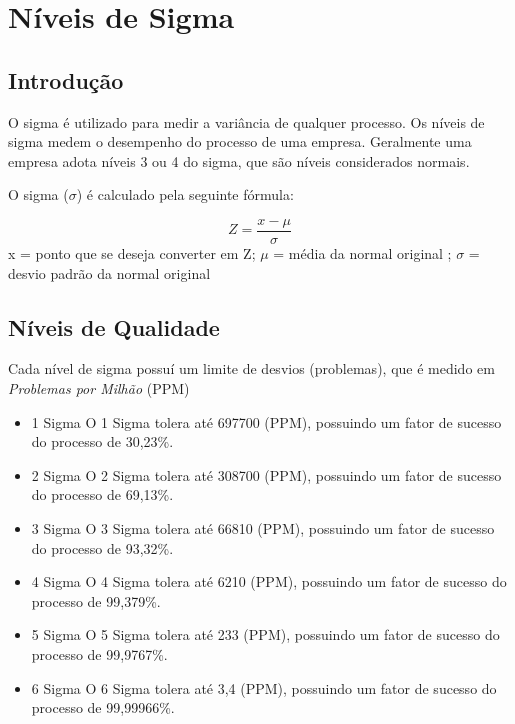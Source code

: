\documentclass{abnt}
\begin{document}
	\chapter {Níveis de Sigma}
		\section {Introdução}
			O sigma é utilizado para medir a variância de qualquer processo. Os níveis de sigma medem o desempenho do processo de uma empresa.
			Geralmente uma empresa adota níveis 3 ou 4 do sigma, que são níveis considerados normais.
			
			O sigma ($\sigma$) é calculado pela seguinte fórmula: 
			\begin{center}
			    \begin{equation}
			       Z = \frac{x - \mu}{\sigma}
		        \end{equation}
		     x = ponto que se deseja converter em Z; $\mu$ =  média da normal original ; $\sigma$ = desvio padrão da normal original
			\end{center}
			
			 
		\section {Níveis de Qualidade}
		    Cada nível de sigma possuí um limite de desvios (problemas), que é medido em  \textit{Problemas por Milhão} (PPM) 
			\begin{itemize}
			    \item {1 Sigma}
			        \subitem O 1 Sigma tolera até 697700 (PPM), possuindo um fator de sucesso do processo de 30,23\%. 
			    \item {2 Sigma}
			        \subitem O 2 Sigma tolera até 308700 (PPM), possuindo um fator de sucesso do processo de 69,13\%.
			    \item {3 Sigma}
			        \subitem O 3 Sigma tolera até 66810 (PPM), possuindo um fator de sucesso do processo de 93,32\%.
			    \item {4 Sigma}
			        \subitem O 4 Sigma tolera até 6210 (PPM), possuindo um fator de sucesso do processo de 99,379\%.
			    \item {5 Sigma}
			        \subitem O 5 Sigma tolera até 233 (PPM), possuindo um fator de sucesso do processo de 99,9767\%.
			    \item {6 Sigma}
			        \subitem O 6 Sigma tolera até 3,4 (PPM), possuindo um fator de sucesso do processo de 99,99966\%.
			\end{itemize}
\end{document}
